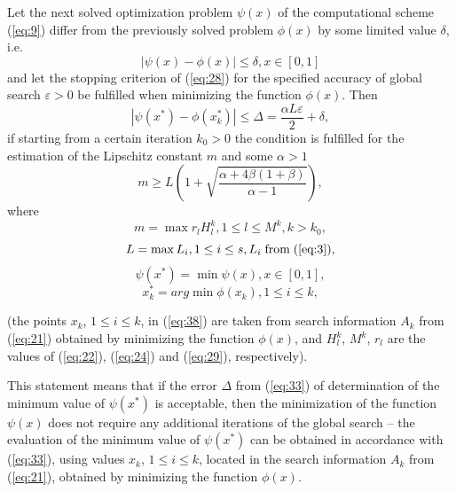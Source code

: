 \documentclass[smallextended]{svjour3}       %
\begin{document}
\begin{theorem}
Let the next solved optimization problem $\psi(x)$ of the computational scheme (\ref{eq:9}) differ from the previously solved problem $\phi(x)$ by some limited value $\delta$, i.e.
\begin{equation}\label{eq:32}
|\psi(x)-\phi(x)| \leq \delta, x \in [0,1]
\end{equation}
and let the stopping criterion of (\ref{eq:28}) for the specified accuracy of global search $\varepsilon>0$ be fulfilled when minimizing the function $\phi(x)$. Then 
\begin{equation}\label{eq:33}
|\psi(x^*)-\phi(x_k^*)| \leq \Delta = \frac{\alpha L \varepsilon}{2} + \delta,
\end{equation}
if starting from a certain iteration $k_0>0$ the condition is fulfilled for the estimation of the Lipschitz constant $m$ and some $\alpha > 1$
\begin{equation}\label{eq:34}
m \geq L (1+ \sqrt{\frac{\alpha + 4 \beta (1 + \beta)}{\alpha - 1}}),
\end{equation}
where
\begin{equation}\label{eq:35}
m=\max{r_l H_l^k}, 1 \leq l \leq M^k, k>k_0,
\end{equation}
\begin{equation}\label{eq:36}
L=\max{L_i}, 1 \leq i \leq s, L_i\; \text{from}\; (\ref{eq:3}),
\end{equation}
\begin{equation}\label{eq:37}
\psi(x^*)=\min{\psi(x)},x \in [0,1],
\end{equation}
\begin{equation}\label{eq:38}
x_k^* = arg \min{\phi(x_k)}, 1 \leq i \leq k, 
\end{equation}
\end{theorem}(the points $x_k$, $1 \leq i \leq k$, in (\ref{eq:38}) are taken from search information $A_k$ from (\ref{eq:21}) obtained by minimizing the function $\phi(x)$, and $H_l^k$, $M^k$, $r_l$ are the values of (\ref{eq:22}), (\ref{eq:24}) and (\ref{eq:29}), respectively).


This statement means that if the error $\Delta$ from (\ref{eq:33}) of determination of the minimum value of $\psi(x^*)$ is acceptable, then the minimization of the function $\psi(x)$ does not require any additional iterations of the global search -- the evaluation of the minimum value of $\psi(x^*)$ can be obtained in accordance with (\ref{eq:33}), using values $x_k$, ${1 \leq i \leq k}$, located in the search information $A_k$ from (\ref{eq:21}), obtained by minimizing the function $\phi(x)$.
\end{document}
